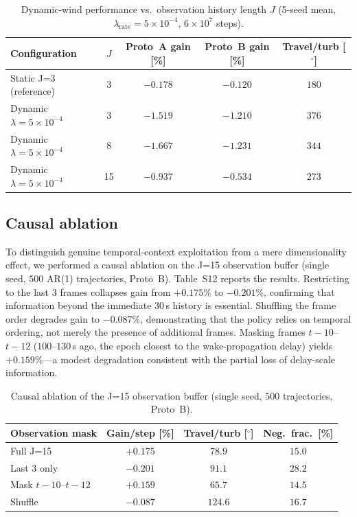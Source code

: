 \documentclass{article}
\begin{document}
\begin{table}[h]
\centering
\caption{Dynamic-wind performance vs.\ observation history length $J$ (5-seed mean, $\lambda_\mathrm{rate}{=}5{\times}10^{-4}$, $6{\times}10^{7}$ steps).}
\label{tab:j_trend}
\small
\begin{tabular}{lcccc}
\toprule
Configuration & $J$ & Proto~A gain [\%] & Proto~B gain [\%] & Travel/turb [$^\circ$] \\
\midrule
Static J=3 (reference) & 3 & $-0.178$ & $-0.120$ & $180$ \\
Dynamic $\lambda{=}5{\times}10^{-4}$ & 3 & $-1.519$ & $-1.210$ & $376$ \\
Dynamic $\lambda{=}5{\times}10^{-4}$ & 8 & $-1.667$ & $-1.231$ & $344$ \\
Dynamic $\lambda{=}5{\times}10^{-4}$ & 15 & $-0.937$ & $-0.534$ & $273$ \\
\bottomrule
\end{tabular}
\end{table}

\subsection{Causal ablation}

To distinguish genuine temporal-context exploitation from a mere dimensionality effect, we performed a causal ablation on the J=15 observation buffer (single seed, $500$ AR(1) trajectories, Proto~B). Table~S12 reports the results. Restricting to the last 3 frames collapses gain from $+0.175\%$ to $-0.201\%$, confirming that information beyond the immediate $30$\,s history is essential. Shuffling the frame order degrades gain to $-0.087\%$, demonstrating that the policy relies on temporal ordering, not merely the presence of additional frames. Masking frames $t{-}10$--$t{-}12$ ($100$--$130$\,s ago, the epoch closest to the wake-propagation delay) yields $+0.159\%$---a modest degradation consistent with the partial loss of delay-scale information.

\begin{table}[h]
\centering
\caption{Causal ablation of the J=15 observation buffer (single seed, $500$ trajectories, Proto~B).}
\label{tab:causal}
\small
\begin{tabular}{lccc}
\toprule
Observation mask & Gain/step [\%] & Travel/turb [$^\circ$] & Neg.\ frac.\ [\%] \\
\midrule
Full J=15        & $+0.175$ & $78.9$  & $15.0$ \\
Last 3 only      & $-0.201$ & $91.1$  & $28.2$ \\
Mask $t{-}10$--$t{-}12$ & $+0.159$ & $65.7$  & $14.5$ \\
Shuffle          & $-0.087$ & $124.6$ & $16.7$ \\
\bottomrule
\end{tabular}
\end{table}
\end{document}
